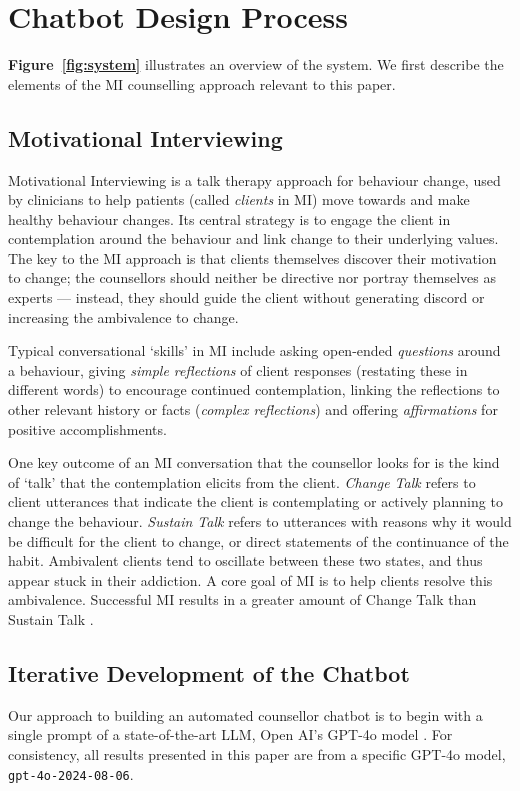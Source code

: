 

\section{Chatbot Design Process}
\label{sec:design}


\textbf{Figure~\ref{fig:system}} illustrates an overview of the \sysname system. We first describe the elements of the MI counselling approach relevant to this paper.

\subsection{Motivational Interviewing}
\label{sec:MIdef}
Motivational Interviewing is a talk therapy approach for behaviour change, used by clinicians to help patients (called \emph{clients} in MI) move towards and make healthy behaviour changes. Its central strategy is to engage the client in contemplation around the behaviour and link change to their underlying values. The key to the MI approach is that clients themselves discover their motivation to change; the counsellors should neither be directive nor portray themselves as experts --- instead, they should guide the client without generating discord or increasing the ambivalence to change.

Typical conversational `skills' in MI include asking open-ended \emph{questions} around a behaviour, giving \emph{simple reflections} of client responses (restating these in different words) to encourage continued contemplation, linking the reflections to other relevant history or facts (\emph{complex reflections}) and offering \emph{affirmations} for positive accomplishments.

One key outcome of an MI conversation that the counsellor looks for is the kind of `talk' that the contemplation elicits from the client. \emph{Change Talk} refers to client utterances that indicate the client is contemplating or actively planning to change the behaviour. \emph{Sustain Talk} refers to utterances with reasons why it would be difficult for the client to change, or direct statements of the continuance of the habit. Ambivalent clients tend to oscillate between these two states, and thus appear stuck in their addiction. A core goal of MI is to help clients resolve this ambivalence. Successful MI results in a greater amount of Change Talk than Sustain Talk \cite{Apodaca2009}.


\subsection{Iterative Development of the Chatbot}
Our approach to building an automated counsellor chatbot is to begin with a single prompt of a state-of-the-art LLM, Open AI's GPT-4o model \citep{openai2024gpt4o}.  For consistency, all results presented in this paper are from a specific GPT-4o model, \texttt{gpt-4o-2024-08-06}.

